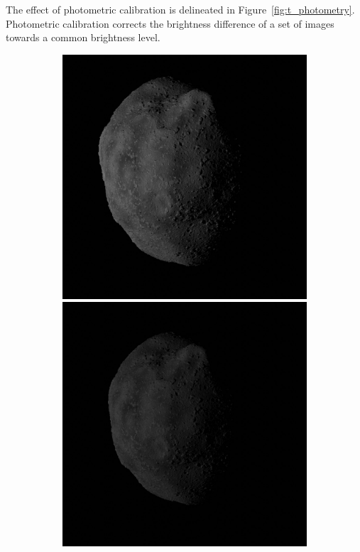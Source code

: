The effect of photometric calibration is delineated in Figure~\ref{fig:t_photometry}. Photometric calibration corrects the brightness difference of a set of images towards a common brightness level.
\begin{figure}[htb]
    \centering
    \begin{subfigure}[b]{0.25\textwidth}
        \centering
        \includegraphics[width=\textwidth]{doc/thesis/0_figures/rendering_lighting/Before_1.png}
        \includegraphics[width=\textwidth]{doc/thesis/0_figures/rendering_lighting/Before_2.png}

\end{subfigure}
\end{figure}

